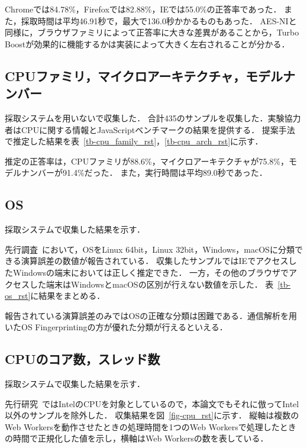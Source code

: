Chromeでは84.78\%，Firefoxでは82.88\%，IEでは55.0\%の正答率であった．
また，採取時間は平均46.91秒で，最大で136.0秒かかるものもあった．
AES-NIと同様に，ブラウザファミリによって正答率に大きな差異があることから，Turbo Boostが効果的に機能するかは実装によって大きく左右されることが分かる．

\subsection{CPUファミリ，マイクロアーキテクチャ，モデルナンバー}
採取システムを用いないで収集した．
合計435のサンプルを収集した．実験協力者はCPUに関する情報とJavaScriptベンチマークの結果を提供する．
提案手法で推定した結果を表~\ref{tb-cpu_family_rst}，\ref{tb-cpu_arch_rst}に示す．





推定の正答率は，CPUファミリが88.6\%，マイクロアーキテクチャが75.8\%，モデルナンバーが91.4\%だった．
また，実行時間は平均89.0秒であった．

\subsection{OS}
採取システムで収集した結果を示す．

先行調査~\cite{tor_mathtan}において，OSをLinux 64bit，Linux 32bit，Windows，macOSに分類できる演算誤差の数値が報告されている．
収集したサンプルではIEでアクセスしたWindowsの端末においては正しく推定できた．
一方，その他のブラウザでアクセスした端末はWindowsとmacOSの区別が行えない数値を示した．
表~\ref{tb-os_rst}に結果をまとめる．



報告されている演算誤差のみではOSの正確な分類は困難である．通信解析を用いたOS Fingerprintingの方が優れた分類が行えるといえる．

\subsection{CPUのコア数，スレッド数}
採取システムで収集した結果を示す．

先行研究~\cite{後藤浩行2013web,桐生直輝2014web}ではIntelのCPUを対象としているので，本論文でもそれに倣ってIntel以外のサンプルを除外した．
収集結果を図~\ref{fig-cpu_rst}に示す．
縦軸は複数のWeb Workersを動作させたときの処理時間を1つのWeb Workersで処理したときの時間で正規化した値を示し，横軸はWeb Workersの数を表している．

